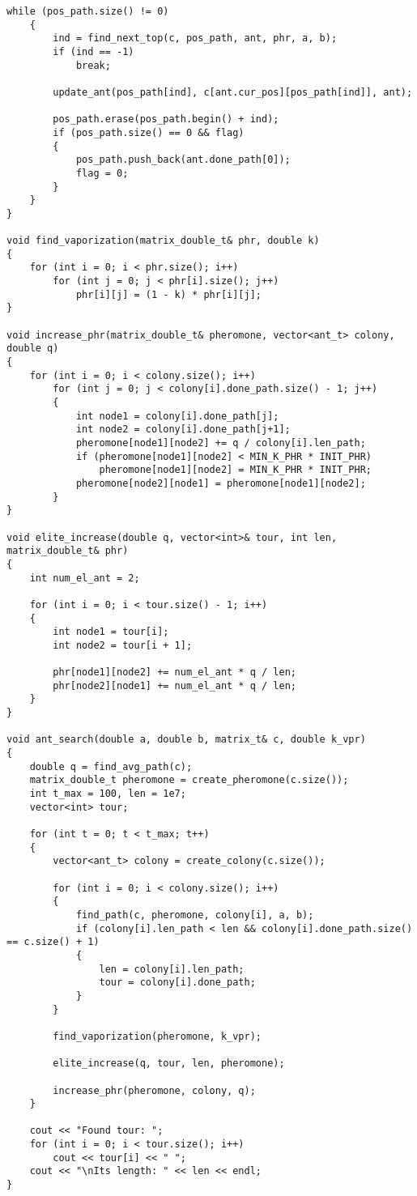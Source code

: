 \begin{lstlisting}[label=code2, caption = Муравьиный алгоритм]
	while (pos_path.size() != 0)
	{
		ind = find_next_top(c, pos_path, ant, phr, a, b);
		if (ind == -1)
			break;
		
		update_ant(pos_path[ind], c[ant.cur_pos][pos_path[ind]], ant);
		
		pos_path.erase(pos_path.begin() + ind);
		if (pos_path.size() == 0 && flag)
		{
			pos_path.push_back(ant.done_path[0]);
			flag = 0;
		}
	}
}

void find_vaporization(matrix_double_t& phr, double k)
{
	for (int i = 0; i < phr.size(); i++)
		for (int j = 0; j < phr[i].size(); j++)
			phr[i][j] = (1 - k) * phr[i][j];
}

void increase_phr(matrix_double_t& pheromone, vector<ant_t> colony, double q)
{
	for (int i = 0; i < colony.size(); i++)
		for (int j = 0; j < colony[i].done_path.size() - 1; j++)
		{
			int node1 = colony[i].done_path[j];
			int node2 = colony[i].done_path[j+1];
			pheromone[node1][node2] += q / colony[i].len_path;
			if (pheromone[node1][node2] < MIN_K_PHR * INIT_PHR)
				pheromone[node1][node2] = MIN_K_PHR * INIT_PHR;
			pheromone[node2][node1] = pheromone[node1][node2];
		}
}

void elite_increase(double q, vector<int>& tour, int len, matrix_double_t& phr)
{
	int num_el_ant = 2;
	
	for (int i = 0; i < tour.size() - 1; i++)
	{
		int node1 = tour[i];
		int node2 = tour[i + 1];
		
		phr[node1][node2] += num_el_ant * q / len;
		phr[node2][node1] += num_el_ant * q / len;
	}
}

void ant_search(double a, double b, matrix_t& c, double k_vpr)
{
	double q = find_avg_path(c);
	matrix_double_t pheromone = create_pheromone(c.size());
	int t_max = 100, len = 1e7;
	vector<int> tour;
	
	for (int t = 0; t < t_max; t++)
	{
		vector<ant_t> colony = create_colony(c.size());
		
		for (int i = 0; i < colony.size(); i++)
		{
			find_path(c, pheromone, colony[i], a, b);
			if (colony[i].len_path < len && colony[i].done_path.size() == c.size() + 1)
			{
				len = colony[i].len_path;
				tour = colony[i].done_path;
			}
		}
		
		find_vaporization(pheromone, k_vpr);
		
		elite_increase(q, tour, len, pheromone);
		
		increase_phr(pheromone, colony, q);
	}
	
	cout << "Found tour: ";
	for (int i = 0; i < tour.size(); i++)
		cout << tour[i] << " ";
	cout << "\nIts length: " << len << endl;
}
\end{lstlisting}

